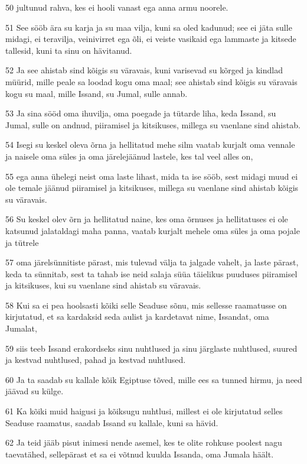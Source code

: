\par 50 jultunud rahva, kes ei hooli vanast ega anna armu noorele.
\par 51 See sööb ära su karja ja su maa vilja, kuni sa oled kadunud; see ei jäta sulle midagi, ei teravilja, veinivirret ega õli, ei veiste vasikaid ega lammaste ja kitsede tallesid, kuni ta sinu on hävitanud.
\par 52 Ja see ahistab sind kõigis su väravais, kuni varisevad su kõrged ja kindlad müürid, mille peale sa loodad kogu oma maal; see ahistab sind kõigis su väravais kogu su maal, mille Issand, su Jumal, sulle annab.
\par 53 Ja sina sööd oma ihuvilja, oma poegade ja tütarde liha, keda Issand, su Jumal, sulle on andnud, piiramisel ja kitsikuses, millega su vaenlane sind ahistab.
\par 54 Isegi su keskel oleva õrna ja hellitatud mehe silm vaatab kurjalt oma vennale ja naisele oma süles ja oma järelejäänud lastele, kes tal veel alles on,
\par 55 ega anna ühelegi neist oma laste lihast, mida ta ise sööb, sest midagi muud ei ole temale jäänud piiramisel ja kitsikuses, millega su vaenlane sind ahistab kõigis su väravais.
\par 56 Su keskel olev õrn ja hellitatud naine, kes oma õrnuses ja hellitatuses ei ole katsunud jalataldagi maha panna, vaatab kurjalt mehele oma süles ja oma pojale ja tütrele
\par 57 oma järelsünnitiste pärast, mis tulevad välja ta jalgade vahelt, ja laste pärast, keda ta sünnitab, sest ta tahab ise neid salaja süüa täielikus puuduses piiramisel ja kitsikuses, kui su vaenlane sind ahistab su väravais.
\par 58 Kui sa ei pea hoolsasti kõiki selle Seaduse sõnu, mis sellesse raamatusse on kirjutatud, et sa kardaksid seda aulist ja kardetavat nime, Issandat, oma Jumalat,
\par 59 siis teeb Issand erakordseks sinu nuhtlused ja sinu järglaste nuhtlused, suured ja kestvad nuhtlused, pahad ja kestvad nuhtlused.
\par 60 Ja ta saadab su kallale kõik Egiptuse tõved, mille ees sa tunned hirmu, ja need jäävad su külge.
\par 61 Ka kõiki muid haigusi ja kõiksugu nuhtlusi, millest ei ole kirjutatud selles Seaduse raamatus, saadab Issand su kallale, kuni sa hävid.
\par 62 Ja teid jääb pisut inimesi nende asemel, kes te olite rohkuse poolest nagu taevatähed, sellepärast et sa ei võtnud kuulda Issanda, oma Jumala häält.

